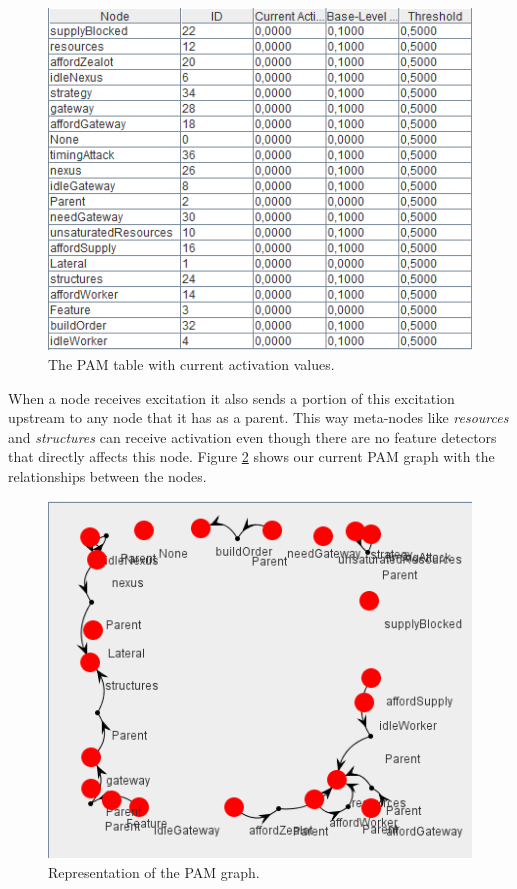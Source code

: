\begin{figure}[h!tb]
\centering
\includegraphics[scale=1.0]{graphics/pam_table.png}
\caption{The PAM table with current activation values.}
\label{fig:pamtable}
\end{figure}

When a node receives excitation it also sends a portion of this excitation upstream to any node that it has as a parent. This way meta-nodes like {\em resources} and {\em structures} can receive activation even though there are no feature detectors that directly affects this node. Figure \ref{fig:pamgraph} shows our current PAM graph with the relationships  between the nodes.

\begin{figure}[h!tb]
\centering
\includegraphics[scale=1.0]{graphics/pam_graph.png}
\caption{Representation of the PAM graph.}
\label{fig:pamgraph}
\end{figure}


